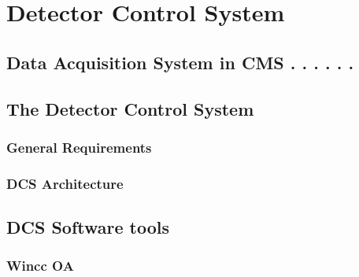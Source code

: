 \def\baselinestretch{1}

\chapter{Detector Control System}




\smallskip

\goodbreak
\section{Data Acquisition System in CMS . . . . . .}


\goodbreak
\section{The Detector Control System}



\smallskip
\subsection{General Requirements}

\smallskip
\subsection{DCS Architecture}


\smallskip
\section{DCS Software tools}

\smallskip
\subsection{Wincc OA}

